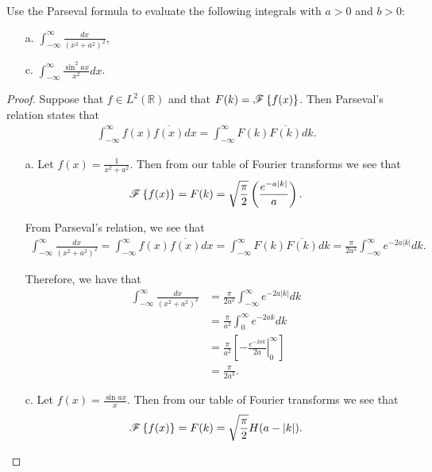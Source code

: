 \begin{problem}{2.23}
  Use the Parseval formula to evaluate the following integrals with $a >0$ and $b >0$:
  \begin{enumerate}
    \item[a.] $\displaystyle \int_{-\infty}^\infty \frac{dx}{(x^2 + a^2)^2}$,
    \item[c.] $\displaystyle \int_{-\infty}^\infty \frac{\sin^2 ax}{x^2}dx$.
  \end{enumerate}
\end{problem}

\begin{proof}
  Suppose that $f\in L^2(\mathbb{R})$ and that $F(k) = \mathscr{F}\left\{ {f(x)} \right\}$. Then Parseval's relation
  states that
  \begin{align*}
    \int_{-\infty}^\infty f(x)\overline{f(x)} dx = \int_{-\infty}^\infty F(k)\overline{F(k)} dk.
  \end{align*}

  \begin{enumerate}
    \item[a.] Let $\displaystyle f(x) = \frac{1}{x^2+a^2}$. Then from our table of Fourier transforms
      we see that
      \begin{align*}
        \mathscr{F}\left\{ {f(x)} \right\} = F(k) = \sqrt{\frac{\pi}{2}}\left(\frac{e^{-a|k|}}{a}\right).
      \end{align*}

      From Parseval's relation, we see that
      \begin{align*}
        \int_{-\infty}^\infty \frac{dx}{(x^2 + a^2)^2}
        = \int_{-\infty}^\infty f(x)\overline{f(x)} dx
        = \int_{-\infty}^\infty F(k)\overline{F(k)} dk
        = \frac{\pi}{2a^2}\int_{-\infty}^\infty e^{-2a|k|} dk.
      \end{align*}

      Therefore, we have that
      \begin{align*}
        \int_{-\infty}^\infty \frac{dx}{(x^2 + a^2)^2}
        &= \frac{\pi}{2a^2}\int_{-\infty}^\infty e^{-2a|k|} dk \\
        &= \frac{\pi}{a^2}\int_0^\infty e^{-2ak} dk \\
        &= \frac{\pi}{a^2}\left[ \left. -\frac{e^{-2a k}}{2a}\right\rvert_{0}^\infty \right] \\
        &= \frac{\pi}{2a^3}.
      \end{align*}

    \item[c.] Let $\displaystyle f(x) = \frac{\sin ax}{x}$. Then from our table of Fourier transforms
      we see that
      \begin{align*}
        \mathscr{F}\left\{ {f(x)} \right\} = F(k) = \sqrt{\frac{\pi}{2}}H(a-|k|).
      \end{align*}


\end{enumerate}
\end{proof}
